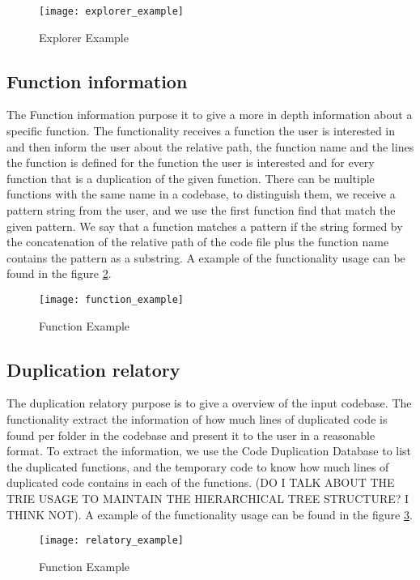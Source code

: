 \begin{figure}
\texttt{[image: explorer\_example]}
\caption{Explorer Example}
\label{fig:explorer_ex}
\end{figure}


\subsection{Function information}

\label{subsec:functioncommand}

The Function information purpose it to give a more in depth information about a specific function. The functionality 
receives a function the user is interested in and then inform the user
about the relative path, the function name and the lines the function is defined for the function the user is interested and for
every function that is a duplication of the given function.
There can be multiple functions with the 
same name in a codebase, to distinguish them, we receive a pattern string from the user, and  we use the first function find that match
the given pattern. We say that a function matches a pattern if the string formed by the concatenation of the relative path of the 
code file plus the function name contains the pattern as a substring. 
A example of the functionality usage can be found in the figure \ref{fig:function_ex}.


\begin{figure}
\texttt{[image: function\_example]}
\caption{Function Example}
\label{fig:function_ex}
\end{figure}


\subsection{Duplication relatory}

The duplication relatory purpose is to give a overview of the input codebase. The functionality extract the information
of how much lines of duplicated code is found per folder in the codebase and present it to the user in a reasonable format. To extract
the information, we use the Code Duplication Database to list the duplicated functions, and the temporary code to know how much lines of
duplicated code contains in each of the functions. (DO I TALK ABOUT THE TRIE USAGE TO MAINTAIN THE HIERARCHICAL TREE STRUCTURE? I 
THINK NOT). A example of the functionality usage can be found in the figure \ref{fig:relatory_ex}.

\begin{figure}
\texttt{[image: relatory\_example]}
\caption{Function Example}
\label{fig:relatory_ex}
\end{figure}





